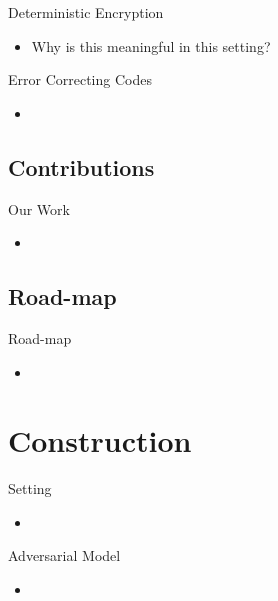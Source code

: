 \documentclass{beamer}
\begin{document}
\begin{frame}{Deterministic Encryption}
	\begin{itemize}
		\setlength\itemsep{1em}
		\item Why is this meaningful in this setting?
	\end{itemize}
\end{frame}

\begin{frame}{Error Correcting Codes}
	\begin{itemize}
		\setlength\itemsep{1em}
		\item 
	\end{itemize}
\end{frame}

\subsection{Contributions}

\begin{frame}{Our Work}
	\begin{itemize}
		\setlength\itemsep{1em}
		\item 
	\end{itemize}
\end{frame}

\subsection{Road-map}
\begin{frame}{Road-map}
	\begin{itemize}
		\setlength\itemsep{1em}
		\item 
	\end{itemize}
\end{frame}

\section{Construction}
\begin{frame}{Setting}
	\begin{itemize}
		\setlength\itemsep{1em}
		\item 
	\end{itemize}
\end{frame}

\begin{frame}{Adversarial Model}
	\begin{itemize}
		\setlength\itemsep{1em}
		\item 
	\end{itemize}
\end{frame}
\end{document}
